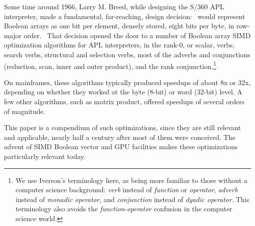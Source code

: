 Some time around 1966, Larry M. Breed, while designing the S/360 
APL interpreter, made a fundamental, far-reaching, design decision: \ibmapl\ 
would represent Boolean arrays as one bit per element, 
densely stored, eight bits per byte, in row-major order.~\cite{IBM:aplxm6}
That decision opened the door to a number of Boolean array SIMD 
optimization algorithms for APL interpreters, in the rank-0, or scalar, verbs, 
search verbs, structural and selection verbs, 
most of the adverbs and conjunctions (reduction, scan, inner and 
outer product), and the rank conjunction.\footnote{We use Iverson's
terminology here, as being more familiar to those without
a computer science background: {\em verb} instead of {\em function}
or {\em operator},
{\em adverb} instead of {\em monadic operator}, and {\em conjunction}
instead of {\em dyadic operator}. This terminology also avoids
the {\em function}-{\em operator} confusion in the computer science world.}

On mainframes, these algorithms typically produced speedups of about 8x or 32x, 
depending on whether they worked at the byte (8-bit) 
or word (32-bit) level. A few other algorithms, such as matrix
product, offered speedups of several orders of magnitude.

This paper is a compendium of such optimizations, since
they are still relevant and applicable, nearly half a century
after most of them were conceived.
The advent of SIMD Boolean vector and GPU facilities 
makes these optimizations particularly relevant today.


